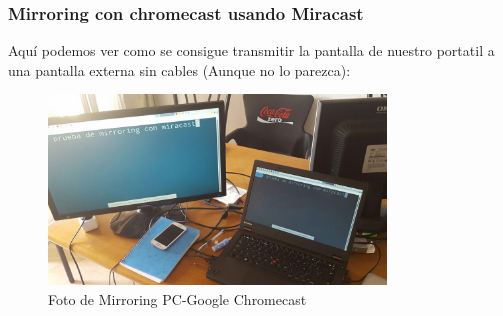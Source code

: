 \begin{frame}
  \frametitle{Mirroring con chromecast usando Miracast}
  Aquí podemos ver como se consigue transmitir la pantalla de nuestro portatil a una pantalla externa sin cables (Aunque no lo parezca):

  \begin{figure}[ht]
    \centering
    \includegraphics[width=0.8\textwidth]{./Imagenes/CapturaChromecast.png}
    \caption{Foto de Mirroring PC-Google Chromecast}
  \end{figure}
\end{frame}
